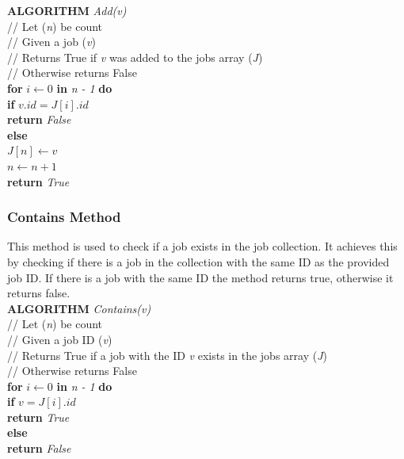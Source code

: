 \documentclass[12pt,a4paper]{article}
\begin{document}
				\textbf{ALGORITHM} \textit{Add(v)}\\
				\null\qquad\quad// Let (\textit{n}) be count\\
				\null\qquad\quad// Given a job (\textit{v})\\
				\null\qquad\quad// Returns True if \textit{v} was added to the jobs array (\textit{J})\\
				\null\qquad\quad// Otherwise returns False\\
				\null\qquad\quad\textbf{for} \textit{$i \gets 0$} \textbf{in} \textit{n - 1} \textbf{do}\\
				\null\qquad\qquad\textbf{if} \textit{$v.id = J[i].id$}\\
				\null\qquad\qquad\quad\textbf{return} \textit{False}\\
				\null\qquad\quad\textbf{else}\\
				\null\qquad\qquad\textit{$J[n] \gets v$}\\
				\null\qquad\qquad\textit{$n \gets n + 1$}\\
				\null\qquad\qquad\textbf{return} \textit{True}\\

			\subsubsection{Contains Method}
				This method is used to check if a job exists in the job collection. It achieves this by 
				checking if there is a job in the collection with the same ID as the provided job ID. If there is 
				a job with the same ID the method returns true, otherwise it returns false.\\

				\textbf{ALGORITHM} \textit{Contains(v)}\\
				\null\qquad\quad// Let (\textit{n}) be count\\
				\null\qquad\quad// Given a job ID (\textit{v})\\
				\null\qquad\quad// Returns True if a job with the ID \textit{v} exists in the jobs array (\textit{J})\\
				\null\qquad\quad// Otherwise returns False\\
				\null\qquad\quad\textbf{for} \textit{$i \gets 0$} \textbf{in} \textit{n - 1} \textbf{do}\\
				\null\qquad\qquad\textbf{if} \textit{$v = J[i].id$}\\
				\null\qquad\qquad\quad\textbf{return} \textit{True}\\
				\null\qquad\quad\textbf{else}\\
				\null\qquad\qquad\textbf{return} \textit{False}
\end{document}
